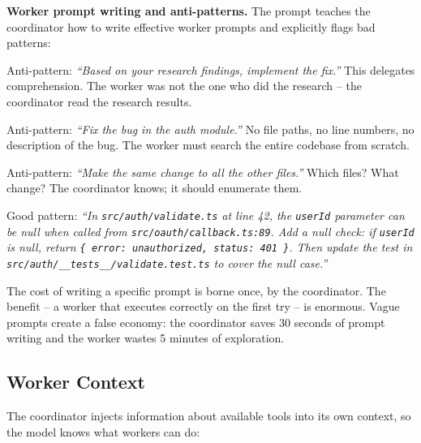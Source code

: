 \documentclass[
  english,
  11pt,
  letterpaper,
]{book}
\begin{document}
\textbf{Worker prompt writing and anti-patterns.} The prompt teaches the
coordinator how to write effective worker prompts and explicitly flags
bad patterns:

Anti-pattern: \emph{``Based on your research findings, implement the
fix.''} This delegates comprehension. The worker was not the one who did
the research -- the coordinator read the research results.

Anti-pattern: \emph{``Fix the bug in the auth module.''} No file paths,
no line numbers, no description of the bug. The worker must search the
entire codebase from scratch.

Anti-pattern: \emph{``Make the same change to all the other files.''}
Which files? What change? The coordinator knows; it should enumerate
them.

Good pattern: \emph{``In \texttt{src/auth/validate.ts} at line 42, the
\texttt{userId} parameter can be null when called from
\texttt{src/oauth/callback.ts:89}. Add a null check: if \texttt{userId}
is null, return
\texttt{\{\ error:\ \textquotesingle{}unauthorized\textquotesingle{},\ status:\ 401\ \}}.
Then update the test in \texttt{src/auth/\_\_tests\_\_/validate.test.ts}
to cover the null case.''}

The cost of writing a specific prompt is borne once, by the coordinator.
The benefit -- a worker that executes correctly on the first try -- is
enormous. Vague prompts create a false economy: the coordinator saves 30
seconds of prompt writing and the worker wastes 5 minutes of
exploration.

\subsection{Worker Context}\label{worker-context}

The coordinator injects information about available tools into its own
context, so the model knows what workers can do:
\end{document}
